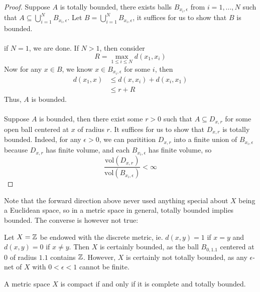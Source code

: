 \begin{proof}
    Suppose $A$ is totally bounded, there exists balls $B_{x_i, \epsilon}$ from $i = 1, ..., N$ such that $A \subseteq \bigcup_{i = 1}^N B_{x_i, \epsilon}$. Let $B = \bigcup_{i = 1}^N B_{x_i, \epsilon}$, it suffices for us to show that $B$ is bounded.\\\\
    if $N = 1$, we are done. If $N > 1$, then consider
    \[R = \max_{1 \leq i \leq N} d(x_1, x_i)\]
    Now for any $x \in B$, we know $x \in B_{x_i, \epsilon}$ for some $i$, then
    \begin{align*}
        d(x_1, x) &\leq d(x, x_i) + d(x_i, x_1) \tag*{Triangle's Inequality}\\
        &\leq r + R
    \end{align*}
    Thus, $A$ is bounded.\\\\
    Suppose $A$ is bounded, then there exist some $r > 0$ such that $A \subseteq D_{x, r}$ for some open ball centered at $x$ of radius $r$. It suffices for us to show that $D_{x, r}$ is totally bounded. Indeed, for any $\epsilon > 0$, we can paritition $D_{x, r}$ into a finite union of $B_{x_i, \epsilon}$ because $D_{x, r}$ has finite volume, and each $B_{x_i, \epsilon}$ has finite volume, so
    \[\frac{\text{vol}(D_{x, r})}{\text{vol}(B_{x_i, \epsilon})} < \infty\]
\end{proof}

Note that the forward direction above never used anything special about $X$ being a Euclidean space, so in a metric space in general, totally bounded implies bounded. The converse is however not true:

\begin{example}
    Let $X = \mathbb{Z}$ be endowed with the discrete metric, ie. $d(x, y) = 1$ if $x = y$ and $d(x, y) = 0$ if $x \neq y$. Then $X$ is certainly bounded, as the ball $B_{0, 1.1}$ centered at $0$ of radius $1.1$ contains $\mathbb{Z}$. However, $X$ is certainly not totally bounded, as any $\epsilon$-net of $X$ with $0 < \epsilon < 1$ cannot be finite.
\end{example}

\begin{lemma}
    A metric space $X$ is compact if and only if it is complete and totally bounded.
\end{lemma}

